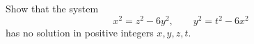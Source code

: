Show that the system
\[
x^2=z^2-6y^2,\qquad y^2=t^2-6x^2
\]
has no solution in positive integers $x,y,z,t$.
